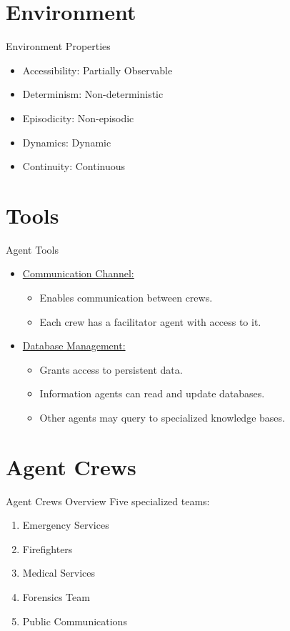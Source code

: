\documentclass{beamer}
\begin{document}
\section{Environment}
\begin{frame}{Environment Properties}
    \begin{itemize}
        \item Accessibility: Partially Observable
        \item Determinism: Non-deterministic
        \item Episodicity: Non-episodic
        \item Dynamics: Dynamic
        \item Continuity: Continuous
    \end{itemize}
\end{frame}

\section{Tools}
\begin{frame}{Agent Tools}
    \begin{itemize}
        \item \underline{Communication Channel:}
        \begin{itemize}
            \item Enables \alert{communication} between crews.
            \item Each crew has a \alert{facilitator} agent with access to it.
        \end{itemize}
        \item \underline{Database Management:}
        \begin{itemize}
            \item Grants access to \alert{persistent} data.
            \item \alert{Information} agents can read and update databases.
            \item Other agents may query to \alert{specialized knowledge} bases.
        \end{itemize}
    \end{itemize}
\end{frame}

\section{Agent Crews}
\begin{frame}{Agent Crews Overview}
    Five specialized teams:
    \begin{enumerate}
        \item Emergency Services
        \item Firefighters
        \item Medical Services
        \item Forensics Team
        \item Public Communications
    \end{enumerate}
\end{frame}
\end{document}
